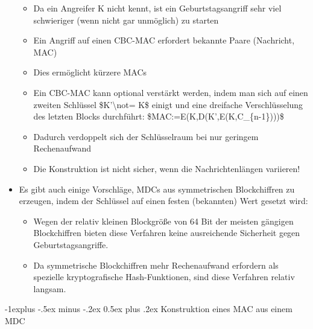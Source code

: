 \documentclass[a4paper]{article}
\makeatletter
\renewcommand{\subsection}{\@startsection{subsection}{2}{0mm}%
 {-1explus -.5ex minus -.2ex}%
 {0.5ex plus .2ex}%
 {\normalfont\normalsize\bfseries}}
\makeatother
\begin{document}
\begin{multicols}{3}
\begin{itemize}
              \begin{itemize}
                  \item
                        Da ein Angreifer K nicht kennt, ist ein Geburtstagsangriff sehr viel
                        schwieriger (wenn nicht gar unmöglich) zu starten
                  \item
                        Ein Angriff auf einen CBC-MAC erfordert bekannte Paare (Nachricht,
                        MAC)
                  \item
                        Dies ermöglicht kürzere MACs
                  \item
                        Ein CBC-MAC kann optional verstärkt werden, indem man sich auf einen
                        zweiten Schlüssel \$K'\textbackslash not= K\$ einigt und eine
                        dreifache Verschlüsselung des letzten Blocks durchführt:
                        \$MAC:=E(K,D(K',E(K,C\_\{n-1\})))\$
                  \item
                        Dadurch verdoppelt sich der Schlüsselraum bei nur geringem
                        Rechenaufwand
                  \item
                        Die Konstruktion ist nicht sicher, wenn die Nachrichtenlängen
                        variieren!
              \end{itemize}
        \item
              Es gibt auch einige Vorschläge, MDCs aus symmetrischen Blockchiffren
              zu erzeugen, indem der Schlüssel auf einen festen (bekannten) Wert
              gesetzt wird:

              \begin{itemize}
                  \item
                        Wegen der relativ kleinen Blockgröße von 64 Bit der meisten gängigen
                        Blockchiffren bieten diese Verfahren keine ausreichende Sicherheit
                        gegen Geburtstagsangriffe.
                  \item
                        Da symmetrische Blockchiffren mehr Rechenaufwand erfordern als
                        spezielle kryptografische Hash-Funktionen, sind diese Verfahren
                        relativ langsam.
              \end{itemize}
    \end{itemize}


    \subsection{Konstruktion eines MAC aus einem
        MDC}


\end{multicols}
\end{document}
